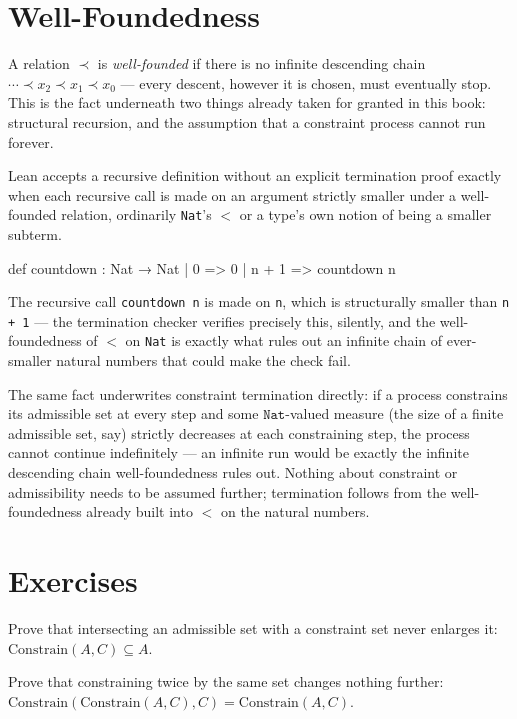 \section{Well-Foundedness}

A relation $\prec$ is \emph{well-founded} if there is no infinite
descending chain $\cdots \prec x_2 \prec x_1 \prec x_0$ — every
descent, however it is chosen, must eventually stop. This is the
fact underneath two things already taken for granted in this book:
structural recursion, and the assumption that a constraint process
cannot run forever.

Lean accepts a recursive definition without an explicit termination
proof exactly when each recursive call is made on an argument
strictly smaller under a well-founded relation, ordinarily
\texttt{Nat}'s $<$ or a type's own notion of being a smaller
subterm.
\begin{lean}
def countdown : Nat → Nat
  | 0 => 0
  | n + 1 => countdown n
\end{lean}
The recursive call \texttt{countdown n} is made on \texttt{n}, which
is structurally smaller than \texttt{n + 1} — the termination
checker verifies precisely this, silently, and the well-foundedness
of $<$ on \texttt{Nat} is exactly what rules out an infinite chain
of ever-smaller natural numbers that could make the check fail.

The same fact underwrites constraint termination directly: if a
process constrains its admissible set at every step and some
$\texttt{Nat}$-valued measure (the size of a finite admissible set,
say) strictly decreases at each constraining step, the process
cannot continue indefinitely — an infinite run would be exactly the
infinite descending chain well-foundedness rules out. Nothing about
constraint or admissibility needs to be assumed further; termination
follows from the well-foundedness already built into $<$ on the
natural numbers.

\section{Exercises}

\begin{exercise}
Prove that intersecting an admissible set with a constraint set never
enlarges it: $\mathrm{Constrain}(A, C) \subseteq A$.
\end{exercise}

\begin{exercise}
Prove that constraining twice by the same set changes nothing further:
$\mathrm{Constrain}(\mathrm{Constrain}(A, C), C) = \mathrm{Constrain}(A, C)$.
\end{exercise}
